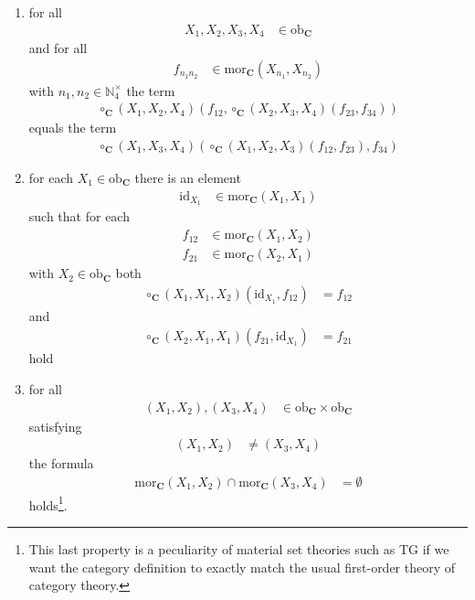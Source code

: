 \begin{enumerate}
\item[(C1)]
for all
\begin{align*}
  X_{1},X_{2},X_{3},X_{4}
  &\in
  \mathrm{ob}_{\mathbf{C}}
\end{align*}  
and for all
\begin{align*}
  f_{n_{1}n_{2}}
  &\in
  \mathrm{mor}_{\mathbf{C}}(X_{n_{1}},X_{n_{2}})
\end{align*}
with $n_{1},n_{2} \in \mathbb{N}_{4}^{\times}$ the term
\begin{align*}
  \circ_{\mathbf{C}}
  (X_{1},X_{2},X_{4})
  \left(
    f_{12},
    \circ_{\mathbf{C}}
    (X_{2},X_{3},X_{4})
    (f_{23},f_{34})
  \right)
\end{align*}
equals the term
\begin{align*}
  \circ_{\mathbf{C}}
  (X_{1},X_{3},X_{4})
  \left(
    \circ_{\mathbf{C}}
    (X_{1},X_{2},X_{3})
    (f_{12},f_{23}),
    f_{34}
  \right)
\end{align*}
\item[(C2)]
for each $X_{1} \in \mathrm{ob}_{\mathbf{C}}$ there is an element
\begin{align*}
  \mathrm{id}_{X_{1}}
  &\in
  \mathrm{mor}_{\mathbf{C}}(X_{1},X_{1})
\end{align*}
such that for each
\begin{align*}
  f_{12}
  &\in
  \mathrm{mor}_{\mathbf{C}}(X_{1},X_{2})
  \\
  f_{21}
  &\in
  \mathrm{mor}_{\mathbf{C}}(X_{2},X_{1})
\end{align*}
with $X_{2} \in \mathrm{ob}_{\mathbf{C}}$ both
\begin{align*}
  \circ_{\mathbf{C}}
  (X_{1},X_{1},X_{2})
  (\mathrm{id}_{X_{1}},f_{12})
  &=
  f_{12}
\end{align*}
and
\begin{align*}
  \circ_{\mathbf{C}}
  (X_{2},X_{1},X_{1})
  (f_{21},\mathrm{id}_{X_{1}})
  &=
  f_{21}
\end{align*}
hold
\item[(C3)]
for all
\begin{align*}
  (X_{1},X_{2}),(X_{3},X_{4})
  &\in
  \mathrm{ob}_{\mathbf{C}}
  \times
  \mathrm{ob}_{\mathbf{C}}
\end{align*}
satisfying
\begin{align*}
  (X_{1},X_{2})
  &\neq
  (X_{3},X_{4})
\end{align*}
the formula
\begin{align*}
  \mathrm{mor}_{\mathbf{C}}(X_{1},X_{2})
  \cap
  \mathrm{mor}_{\mathbf{C}}(X_{3},X_{4})
  &=
  \emptyset
\end{align*}
holds\footnote{This last property is a peculiarity of material set theories such as TG if we want the category definition to exactly match the usual first-order theory of category theory.}.
\end{enumerate}
